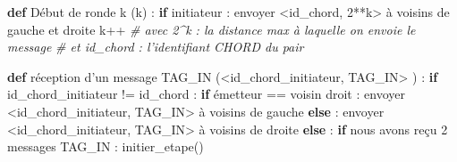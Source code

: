 \documentclass[
]{article}
\newenvironment{Shaded}{}{}
\newcommand{\CommentTok}[1]{\textcolor[rgb]{0.38,0.63,0.69}{\textit{#1}}}
\newcommand{\ControlFlowTok}[1]{\textcolor[rgb]{0.00,0.44,0.13}{\textbf{#1}}}
\newcommand{\DecValTok}[1]{\textcolor[rgb]{0.25,0.63,0.44}{#1}}
\newcommand{\KeywordTok}[1]{\textcolor[rgb]{0.00,0.44,0.13}{\textbf{#1}}}
\newcommand{\NormalTok}[1]{#1}
\newcommand{\OperatorTok}[1]{\textcolor[rgb]{0.40,0.40,0.40}{#1}}
\begin{document}
\begin{Shaded}
\begin{Highlighting}[]
\KeywordTok{def}\NormalTok{ Début de ronde k (k) :}
    \ControlFlowTok{if}\NormalTok{ initiateur :}
\NormalTok{        envoyer }\OperatorTok{\textless{}}\NormalTok{id\_chord, }\DecValTok{2}\OperatorTok{**}\NormalTok{k}\OperatorTok{\textgreater{}}\NormalTok{ à voisins de gauche et droite}
\NormalTok{        k}\OperatorTok{++}
\CommentTok{\# avec 2\^{}k : la distance max à laquelle on envoie le message}
\CommentTok{\# et id\_chord : l’identifiant CHORD du pair}
\end{Highlighting}
\end{Shaded}

\begin{Shaded}
\begin{Highlighting}[]
\KeywordTok{def}\NormalTok{ réception d’un message TAG\_IN (}\OperatorTok{\textless{}}\NormalTok{id\_chord\_initiateur, TAG\_IN}\OperatorTok{\textgreater{}}\NormalTok{ ) :}
    \ControlFlowTok{if}\NormalTok{ id\_chord\_initiateur }\OperatorTok{!=}\NormalTok{ id\_chord :}
        \ControlFlowTok{if}\NormalTok{ émetteur }\OperatorTok{==}\NormalTok{ voisin droit :}
\NormalTok{            envoyer }\OperatorTok{\textless{}}\NormalTok{id\_chord\_initiateur, TAG\_IN}\OperatorTok{\textgreater{}}\NormalTok{ à voisins de gauche}
        \ControlFlowTok{else}\NormalTok{ :}
\NormalTok{            envoyer }\OperatorTok{\textless{}}\NormalTok{id\_chord\_initiateur, TAG\_IN}\OperatorTok{\textgreater{}}\NormalTok{ à voisins de droite}
    \ControlFlowTok{else}\NormalTok{ :}
        \ControlFlowTok{if}\NormalTok{ nous avons reçu }\DecValTok{2}\NormalTok{ messages TAG\_IN :}
\NormalTok{            initier\_etape()}
\end{Highlighting}
\end{Shaded}
\end{document}

